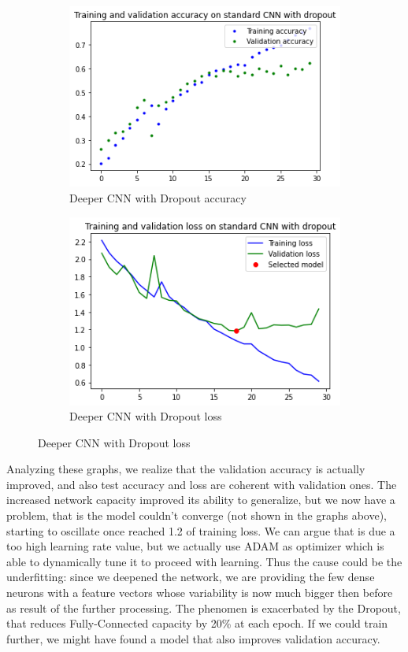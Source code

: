 \begin{figure}[H]
	\begin{subfigure}{0.5\textwidth}
		\includegraphics[width=0.9\linewidth]{img/scratch/deeper_dropout_acc.png} 
		\caption{Deeper CNN with Dropout accuracy}
		\label{fig:DeeperDroupoutacc}
	\end{subfigure}
	\begin{subfigure}{0.5\textwidth}
		\includegraphics[width=0.9\linewidth]{img/scratch/deeper_dropout_loss.png}
		\caption{Deeper CNN with Dropout loss}
		\label{fig:DeeperDropoutloss}
	\end{subfigure}
\end{figure}

\medskip

\noindent Analyzing these graphs, we realize that the validation accuracy is actually improved, and also test accuracy and loss are coherent with validation ones. The increased network capacity improved its ability to generalize, but we now have a problem, that is the model couldn't converge (not shown in the graphs above), starting to oscillate once reached 1.2 of training loss. We can argue that is due a too high learning rate value, but we actually use ADAM as optimizer which is able to dynamically tune it to proceed with learning. Thus the cause could be the underfitting: since we deepened the network, we are providing the few dense neurons with a feature vectors whose variability is now much bigger then before as result of the further processing. The phenomen is exacerbated by the Dropout, that reduces Fully-Connected capacity by 20\% at each epoch. If we could train further, we might have found a model that also improves validation accuracy.



